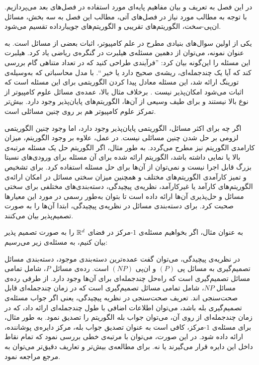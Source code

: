 

در این فصل به تعریف و بیان مفاهیم پایه‌ا‌ی مورد استفاده در فصل‌های بعد می‌پردازیم. با توجه به مطالب مورد نیاز در فصل‌های آتی، مطالب این فصل به سه بخش، مسائل ان‌پی-سخت، الگوریتم‌های تقریبی و الگوریتم‌های جویبارداده تقسیم می‌شود.

یکی از اولین سوال‌های بنیادی مطرح در علم کامپیوتر، اثبات  بعضی از مسائل است. به عنوان نمونه، می‌توان از دهمین مسئله‌ی هیلبرت در گنگره‌ی ریاضی یاد کرد. هیلبرت این مسئله را این‌گونه بیان کرد:‌ ''فرآیندی طراحی کنید که در تعداد متناهی گام بررسی کند که آیا یک چندجمله‌ای، ریشه‌ی صحیح دارد یا خیر ``. با مدل محاسباتی که به‌وسیله‌ی تورینگ ارائه‌ شد، این مسئله معادل پیدا کردن الگوریتمی برای این مسئله است که اثبات می‌شود امکان‌پذیر نیست . برخلاف مثال بالا، عمده‌ی مسائل علوم کامپیوتر از نوع بالا نیستند و برای طیف وسیعی از آن‌ها، الگوریتم‌های پایان‌پذیر وجود دارد. بیش‌تر تمرکز علوم کامپیوتر هم بر روی چنین مسائلی است.

اگر چه برای اکثر مسائل، الگوریتمی پایان‌پذیر وجود دارد، اما وجود چنین الگوریتمی لزومی بر حل شدن چنین مسائلی نیست. در عمل، علاوه بر وجود الگوریتم، میزان کارامدی الگوریتم نیز مطرح می‌گردد. به طور مثال، اگر الگوریتم حل یک مسئله مرتبه‌ی بالا یا نمایی داشته باشد، الگوریتم ارائه شده برای آن مسئله برای ورودی‌های نسبتا بزرگ قابل اجرا نیست و نمی‌توان از آن‌ها برای حل مسئله استفاده کرد. برای تشخیص و تمیز کارآمدی الگوریتم‌های مختلف و همچنین میزان سختی مسائل در امکان ارائه‌ی الگوریتم‌های کارآمد یا غیرکارآمد، نظریه‌ی پیچیدگی، دسته‌بندی‌های مختلفی برای سختی مسائل و حل‌پذیری آن‌ها ارائه داده است تا بتوان به‌طور رسمی در مورد این معیار‌ها صحبت کرد. برای دسته‌بندی مسائل در نظریه‌ی پیچیدگی، ابتدا آن‌ها را به صورت تصمیم‌پذیر بیان می‌کنند.


به عنوان مثال، اگر بخواهیم مسئله‌ی $1$-مرکز در فضای $\mathbb{R}^d$ را به صورت تصمیم پذیر بیان کنیم، به مسئله‌ی زیر می‌رسیم:


در نظریه‌ی پیچیدگی، می‌توان گفت عمده‌ترین دسته‌بندی موجود، دسته‌بندی مسائل تصمیم‌گیری به مسائل پی $(P)$ و  ان‌پی $(NP)$ است. رده‌ی مسائل $P$، شامل تمامی مسائل تصمیم‌گیری است که راه‌حل چندجمله‌ای برای آن‌ها وجود دارد. از طرفی رده‌ی مسائل $NP$، شامل تمامی مسائل تصمیم‌گیری است که در زمان چندجمله‌ای قابل صحت‌سنجی اند. تعریف صحت‌سنجی در نظریه پیچیدگی، یعنی اگر جواب مسئله‌ی تصمیم‌گیری بله باشد، می‌توان اطلاعات اضافی با طول چندجمله‌ای ارائه داد، که در زمان چند‌جمله‌ای از روی آن، می‌توان جواب بله الگوریتم را تصدیق نمود. به طور مثال، برای مسئله‌ی $1$-مرکز، کافی است به عنوان تصدیق جواب بله، مرکز دایره‌ی پوشاننده، ارائه داده شود. در این صورت، می‌توان با مرتبه‌ی خطی بررسی نمود که تمام نقاط داخل این دایره قرار می‌گیرند یا نه. برای مطالعه‌ی بیش‌تر و تعاریف دقیق‌تر می‌توان به  مرجع  مراجعه نمود.


